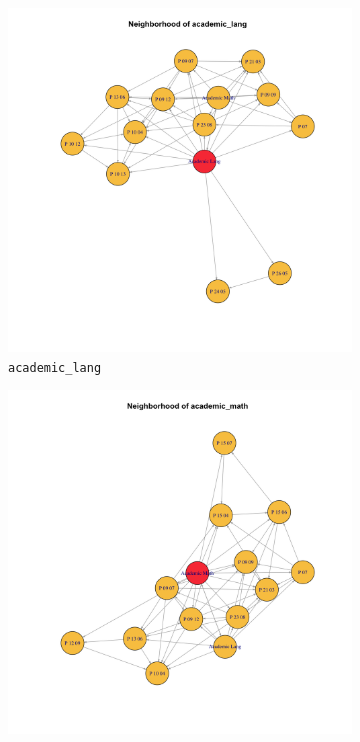 \documentclass[11pt]{article}
\begin{document}
\begin{figure}[H]
  \centering
  \begin{subfigure}[b]{0.32\textwidth}
    \centering
    \includegraphics[width=\textwidth]{pc_estudiante_questions_academic_lang_neighborhood_m4.png}
    \caption{\texttt{academic\_lang}}
  \end{subfigure}
  \begin{subfigure}[b]{0.32\textwidth}
    \centering
    \includegraphics[width=\textwidth]{pc_estudiante_questions_academic_math_neighborhood_m4.png}

\end{subfigure}
\end{figure}
\end{document}
